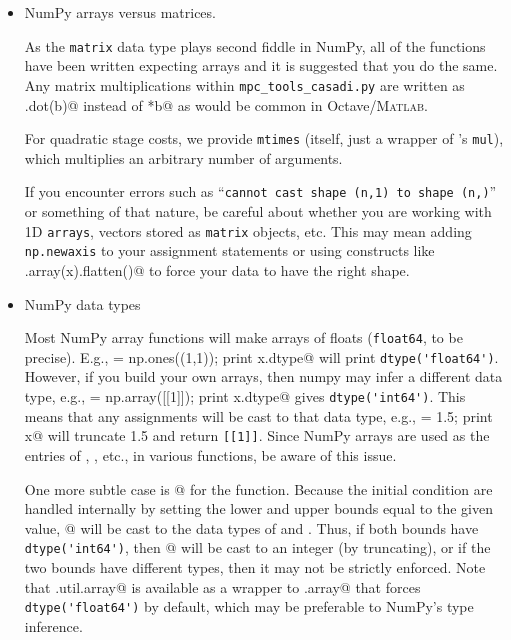 \documentclass{article}
\begin{document}
\begin{itemize}
    \item NumPy arrays versus matrices.
    
    As the \texttt{matrix} data type plays second fiddle in NumPy, all of the functions have been written expecting arrays and it is suggested that you do the same.
    Any matrix multiplications within \texttt{mpc\_tools\_casadi.py} are written as \lstinline@A.dot(b)@ instead of \lstinline@A*b@ as would be common in Octave/\textsc{Matlab}.
    
    For quadratic stage costs, we provide \texttt{mtimes} (itself, just a wrapper of \casadi{}'s \texttt{mul}), which multiplies an arbitrary number of arguments.
    
    If you encounter errors such as ``\texttt{cannot cast shape (n,1) to shape (n,)}'' or something of that nature, be careful about whether you are working with 1D \texttt{arrays}, vectors stored as \texttt{matrix} objects, etc.
    This may mean adding \texttt{np.newaxis} to your assignment statements or using constructs like \lstinline@np.array(x).flatten()@ to force your data to have the right shape.
    
    \item NumPy data types
    
    Most NumPy array functions will make arrays of floats (\lstinline[style=output]@float64@, to be precise).
    E.g., \lstinline@x = np.ones((1,1)); print x.dtype@ will print \lstinline[style=output]@dtype('float64')@.
    However, if you build your own arrays, then numpy may infer a different data type, e.g., \lstinline@x = np.array([[1]]); print x.dtype@ gives \lstinline[style=output]@dtype('int64')@.
    This means that any assignments will be cast to that data type, e.g., \lstinline@x[0,0] = 1.5; print x@ will truncate 1.5 and return \lstinline[style=output]@[[1]]@.
    Since NumPy arrays are used as the entries of \lstinline@lb@, \lstinline@ub@, etc., in various functions, be aware of this issue.
    
    One more subtle case is @ for the \lstinline@nmpc@ function.
    Because the initial condition are handled internally by setting the lower and upper bounds equal to the given value, @ will be cast to the data types of \lstinline@lb@ and \lstinline@ub@.
    Thus, if both bounds have \lstinline[style=output]@dtype('int64')@, then @ will be cast to an integer (by truncating), or if the two bounds have different types, then it may not be strictly enforced.
    Note that \lstinline@mpctools.util.array@ is available as a wrapper to \lstinline@numpy.array@ that forces \lstinline[style=output]@dtype('float64')@ by default, which may be preferable to NumPy's type inference.
    

\end{itemize}
\end{document}
